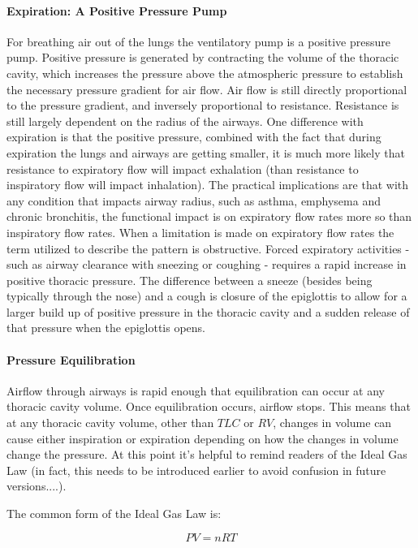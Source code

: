 \paragraph{Expiration: A Positive Pressure Pump} For breathing air out of the lungs the ventilatory pump is a positive pressure pump. Positive pressure is generated by contracting the volume of the thoracic cavity, which increases the pressure above the atmospheric pressure to establish the necessary pressure gradient for air flow. Air flow is still directly proportional to the pressure gradient, and inversely proportional to resistance. Resistance is still largely dependent on the radius of the airways. 
One difference with expiration is that the positive pressure, combined with the fact that during expiration the lungs and airways are getting smaller, it is much more likely that resistance to expiratory flow will impact exhalation (than resistance to inspiratory flow will impact inhalation). The practical implications are that with any condition that impacts airway radius, such as asthma, emphysema and chronic bronchitis, the functional impact is on expiratory flow rates more so than inspiratory flow rates. When a limitation is made on expiratory flow rates the term utilized to describe the pattern is obstructive. 
Forced expiratory activities - such as airway clearance with sneezing or coughing - requires a rapid increase in positive thoracic pressure. The difference between a sneeze (besides being typically through the nose) and a cough is closure of the epiglottis to allow for a larger build up of positive pressure in the thoracic cavity and a sudden release of that pressure when the epiglottis opens.  

\paragraph{Pressure Equilibration} Airflow through airways is rapid enough that equilibration can occur at any thoracic cavity volume. Once equilibration occurs, airflow stops. This means that at any thoracic cavity volume, other than $TLC$ or $RV$, changes in volume can cause either inspiration or expiration depending on how the changes in volume change the pressure. At this point it's helpful to remind readers of the Ideal Gas Law (in fact, this needs to be introduced earlier to avoid confusion in future versions....). 

The common form of the Ideal Gas Law is: 

\begin{equation}
    PV = nRT
    \label{ideal_gas}
\end{equation}

